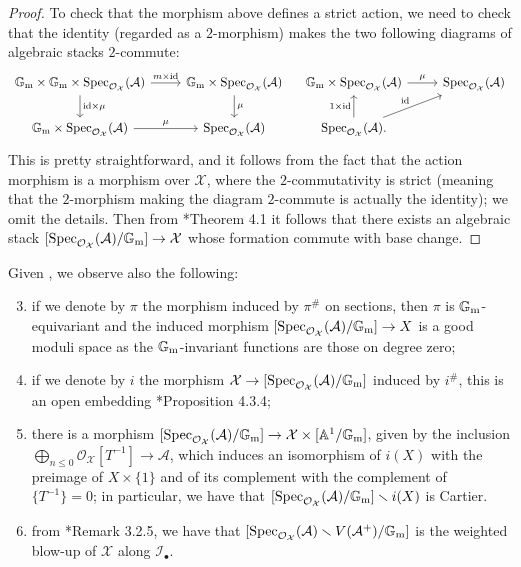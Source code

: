 \documentclass{amsart}
\newcommand{\bA}{\mathbb{A}}
\newcommand{\bG}{\mathbb{G}}
\newcommand{\cA}{\mathcal{A}}
\newcommand{\cI}{\mathcal{I}}
\newcommand{\cO}{\mathcal{O}}
\newcommand{\cX}{\mathcal{X}}
\newcommand{\spec}{\operatorname{Spec}}
\newcommand{\Gm}{\bG_{{\rm m}}}
\newcommand{\id}{\rm{id}}
\theoremstyle{definition}
\theoremstyle{definition}
\begin{document}
{\begin{proof}
    To check that the morphism above defines a strict action, we need to check that the identity (regarded as a $2$-morphism) makes the two following diagrams of algebraic stacks $2$-commute:
    \[
    \begin{tikzcd}
        \Gm \times \Gm \times \spec_{\cO_\cX}(\cA) \ar[r, "m\times \id"] \ar[d, "\id\times\mu"] & \Gm \times \spec_{\cO_\cX}(\cA) \ar[d, "\mu"] \\
        \Gm \times \spec_{\cO_\cX}(\cA) \ar[r, "\mu"] & \spec_{\cO_\cX}(\cA)
    \end{tikzcd} \quad
    \begin{tikzcd}
        \Gm \times \spec_{\cO_\cX}(\cA) \ar[r, "\mu"] & \spec_{\cO_\cX}(\cA) \\
        \spec_{\cO_\cX}(\cA). \ar[u, "1\times\id"] \ar[ur, "\id"]
    \end{tikzcd}
    \]
    This is pretty straightforward, and it follows from the fact that the action morphism is a morphism over $\cX$, where the $2$-commutativity is strict (meaning that the $2$-morphism making the diagram $2$-commute is actually the identity); we omit the details. Then from \cite{Rom05}*{Theorem 4.1} it follows that there exists an algebraic stack $[\spec_{\cO_\cX}(\cA)/\Gm]\to \cX$ whose formation commute with base change.
\end{proof}
Given , we observe also the following:
\begin{enumerate}
    \setcounter{enumi}{2}
    \item if we denote by $\pi$ the morphism induced by $\pi^\#$ on sections, then $\pi$ is $\Gm$-equivariant and the induced morphism $[\spec_{\cO_\cX}(\cA)/\Gm]\to X$ is a good moduli space as the $\Gm$-invariant functions are those on degree zero;
    \item if we denote by $i$ the morphism $\cX\to [\spec_{\cO_\cX}(\cA)/\Gm]$ induced by $i^\#$, this is an open embedding \cite{QR}*{Proposition 4.3.4};
    \item there is a morphism $ [\spec_{\cO_\cX}(\cA)/\Gm]\to \cX\times[\bA^1/\Gm]$, given by the inclusion $\bigoplus_{n\le 0}\cO_\cX[T^{-1}]\to \cA$, which induces an isomorphism of $i(X)$ with the preimage of $X\times \{1\}$ and of its complement with the complement of $\{T^{-1}\}=0$; in particular, we have that $[\spec_{\cO_\cX}(\cA)/\Gm]\smallsetminus i(X)$ is Cartier.
    \item from \cite{QR}*{Remark 3.2.5}, we have that $[\spec_{\cO_\cX}(\cA)\smallsetminus V(\cA^+)/\Gm]$ is the weighted blow-up of $\cX$ along $\cI_\bullet$.

\end{enumerate}}
\end{document}
